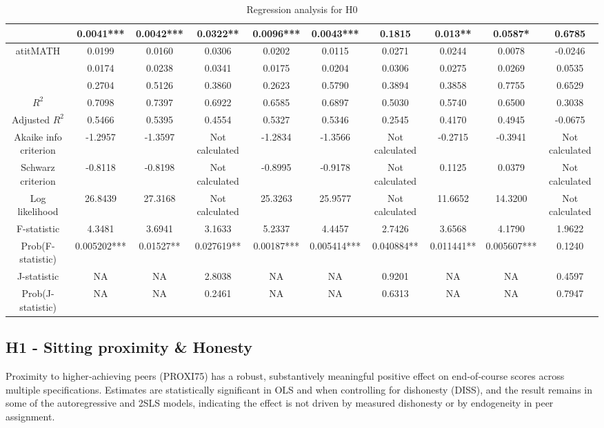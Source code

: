 \documentclass[]{article}
\begin{document}
\begin{landscape}
\begin{table}[htp]
\begin{adjustbox}{height=0.525\textheight,width=1.5\textwidth}
\begin{tabular}{c|ccc|ccc|ccc}
		& 0.0041*** & 0.0042*** & 0.0322** & 0.0096*** & 0.0043*** & 0.1815 & 0.013** & 0.0587* & 0.6785 \\
		\hline
		atitMATH & 0.0199 & 0.0160 & 0.0306 & 0.0202 & 0.0115 & 0.0271 & 0.0244 & 0.0078 & -0.0246 \\
		& 0.0174 & 0.0238 & 0.0341 & 0.0175 & 0.0204 & 0.0306 & 0.0275 & 0.0269 & 0.0535 \\
		& 0.2704 & 0.5126 & 0.3860 & 0.2623 & 0.5790 & 0.3894 & 0.3858 & 0.7755 & 0.6529 \\
		\hline
		$R^2$ & 0.7098 & 0.7397 & 0.6922 & 0.6585 & 0.6897 & 0.5030 & 0.5740 & 0.6500 & 0.3038 \\
		Adjusted $R^2$ & 0.5466 & 0.5395 & 0.4554 & 0.5327 & 0.5346 & 0.2545 & 0.4170 & 0.4945 & -0.0675 \\
		Akaike info criterion & -1.2957 & -1.3597 & Not calculated & -1.2834 & -1.3566 & Not calculated & -0.2715 & -0.3941 & Not calculated \\
		Schwarz criterion & -0.8118 & -0.8198 & Not calculated & -0.8995 & -0.9178 & Not calculated & 0.1125 & 0.0379 & Not calculated \\
		Log likelihood & 26.8439 & 27.3168 & Not calculated & 25.3263 & 25.9577 & Not calculated & 11.6652 & 14.3200 & Not calculated \\
		\hline
		F-statistic & 4.3481 & 3.6941 & 3.1633 & 5.2337 & 4.4457 & 2.7426 & 3.6568 & 4.1790 & 1.9622 \\
		Prob(F-statistic) & 0.005202*** & 0.01527** & 0.027619** & 0.00187*** & 0.005414*** & 0.040884** & 0.011441** & 0.005607*** & 0.1240 \\
		J-statistic & NA & NA & 2.8038 & NA & NA & 0.9201 & NA & NA & 0.4597 \\
		Prob(J-statistic) & NA & NA & 0.2461 & NA & NA & 0.6313 & NA & NA & 0.7947 \\
		\hline
	\end{tabular}
	\end{adjustbox}
	\caption{Regression analysis for H0}  
	\end{table} 
	\end{landscape}
	
	\subsection{H1 - Sitting proximity \& Honesty}
	Proximity to higher‑achieving peers (PROXI75) has a robust, substantively meaningful positive effect on end‑of‑course scores across multiple specifications. Estimates are statistically significant in OLS and when controlling for dishonesty (DISS), and the result remains in some of the autoregressive and 2SLS models, indicating the effect is not driven by measured dishonesty or by endogeneity in peer assignment.\\
	
\end{document}
